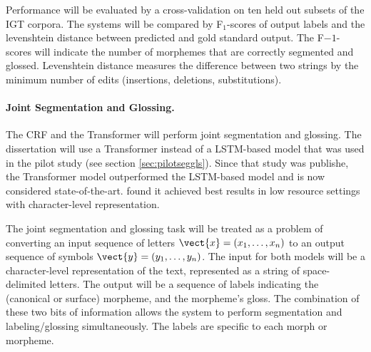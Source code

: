 Performance will be evaluated by a cross-validation on ten held out subsets of the IGT corpora. The systems will be compared by F$_1$-scores of output labels and the levenshtein distance between predicted and gold standard output. 
The F$-1$-scores will indicate the number of morphemes that are correctly segmented and glossed. Levenshtein distance measures the difference between two strings by the minimum number of edits (insertions, deletions, substitutions). 

\paragraph{Joint Segmentation and Glossing.}
The CRF and the Transformer will perform joint segmentation and glossing. The dissertation will use a Transformer instead of a LSTM-based model that was used in the pilot study (see section \ref{sec:pilotseggls}). Since that study was publishe, the Transformer model outperformed the LSTM-based model and is now considered state-of-the-art. \cite{wu2020applying} found it achieved best results in low resource settings with character-level representation. 


The joint segmentation and glossing task will be treated as a problem of converting an input sequence of letters $\vect{x} = (x_1, \ldots, x_n)$ to an output sequence of symbols $\vect{y} = (y_1, \ldots, y_n)$. The input for both models will be a character-level representation of the text, represented as a string of space-delimited letters. The output will be a sequence of labels indicating the (canonical or surface) morpheme, and the morpheme's gloss. The combination of these two bits of information allows the system to perform segmentation and labeling/glossing simultaneously. The labels are specific to each morph or morpheme. %


